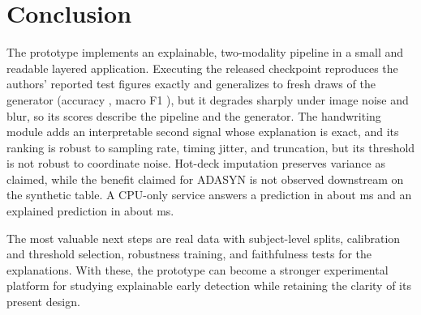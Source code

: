 \documentclass[conference]{IEEEtran}
\begin{document}
\section{Conclusion}
The prototype implements an explainable, two-modality pipeline in a small and readable layered application. Executing the released checkpoint reproduces the authors' reported test figures exactly and generalizes to fresh draws of the generator (accuracy \PoolAcc{}, macro F1 \PoolFone{}), but it degrades sharply under image noise and blur, so its scores describe the pipeline and the generator. The handwriting module adds an interpretable second signal whose explanation is exact, and its ranking is robust to sampling rate, timing jitter, and truncation, but its threshold is not robust to coordinate noise. Hot-deck imputation preserves variance as claimed, while the benefit claimed for ADASYN is not observed downstream on the synthetic table. A CPU-only service answers a prediction in about \PredictMedian{} ms and an explained prediction in about \ExplainMedian{} ms.

The most valuable next steps are real data with subject-level splits, calibration and threshold selection, robustness training, and faithfulness tests for the explanations. With these, the prototype can become a stronger experimental platform for studying explainable early detection while retaining the clarity of its present design.



\end{document}
